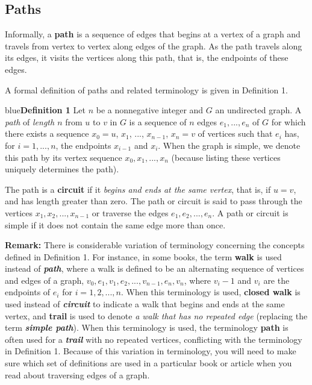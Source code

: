 \documentclass[11pt]{article}
\newenvironment{definition}[1]{\begin{mybox}{blue}{\textbf{Definition #1}}}{\end{mybox}}
\begin{document}
\subsection{Paths}

Informally, a \textbf{path} is a sequence of edges that begins at a vertex of a graph and travels from vertex to vertex along edges of the graph. As the path travels along its edges, it visits the vertices along this path, that is, the endpoints of these edges.

A formal definition of paths and related terminology is given in Definition 1.

\begin{definition}{1}
Let $n$ be a nonnegative integer and $G$ an undirected graph. A \textit{path} of \textit{length $n$} from $u$ to $v$ in $G$ is a sequence of $n$ edges $e_1, ..., e_n$ of $G$ for which there exists a sequence $x_0 = u$, $x_1$, ..., $x_{n-1}$, $x_n = v$ of vertices such that $e_i$ has, for $i = 1, ..., n$, the endpoints $x_{i-1}$ and $x_i$. When the graph is simple, we denote this path by its vertex sequence $x_0, x_1, ..., x_n$ (because listing these vertices uniquely determines the path).

The path is a \textbf{circuit} if it \textit{begins and ends at the same vertex}, that is, if $u = v$, and has length greater than zero. The path or circuit is said to pass through the vertices $x_1, x_2, ..., x_{n-1}$ or traverse the edges $e_1, e_2, ..., e_n$. A path or circuit is simple if it does not contain the same edge more than once.
\end{definition}

\newpage
\textbf{Remark:} There is considerable variation of terminology concerning the concepts defined in Definition 1. For instance, in some books, the term \textbf{walk} is used instead of \textit{\textbf{path}}, where a walk is defined to be an alternating sequence of vertices and edges of a graph, $v_0, e_1, v_1, e_2, ..., v_{n-1}, e_n, v_n$, where $v_i - 1$ and $v_i$ are the endpoints of $e_i$ for $i = 1, 2, ..., n$. When this terminology is used, \textbf{closed walk} is used instead of \textit{\textbf{circuit}} to indicate a walk that begins and ends at the same vertex, and \textbf{trail} is used to denote \textit{a walk that has no repeated edge} (replacing the term \textit{\textbf{simple path}}). When this terminology is used, the terminology \textbf{path} is often used for a \textit{\textbf{trail}} with no repeated vertices, conflicting with the terminology in Definition 1. Because of this variation in terminology, you will need to make sure which set of definitions are used in a particular book or article when you read about traversing edges of a graph.
\end{document}
